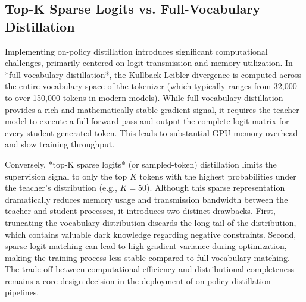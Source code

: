 \subsection{Top-K Sparse Logits vs. Full-Vocabulary Distillation}

Implementing on-policy distillation introduces significant computational challenges, primarily centered on logit transmission and memory utilization. In *full-vocabulary distillation*, the Kullback-Leibler divergence is computed across the entire vocabulary space of the tokenizer (which typically ranges from 32,000 to over 150,000 tokens in modern models). While full-vocabulary distillation provides a rich and mathematically stable gradient signal, it requires the teacher model to execute a full forward pass and output the complete logit matrix for every student-generated token. This leads to substantial GPU memory overhead and slow training throughput.

Conversely, *top-K sparse logits* (or sampled-token) distillation limits the supervision signal to only the top $K$ tokens with the highest probabilities under the teacher's distribution (e.g., $K=50$). Although this sparse representation dramatically reduces memory usage and transmission bandwidth between the teacher and student processes, it introduces two distinct drawbacks. First, truncating the vocabulary distribution discards the long tail of the distribution, which contains valuable dark knowledge regarding negative constraints. Second, sparse logit matching can lead to high gradient variance during optimization, making the training process less stable compared to full-vocabulary matching. The trade-off between computational efficiency and distributional completeness remains a core design decision in the deployment of on-policy distillation pipelines.
